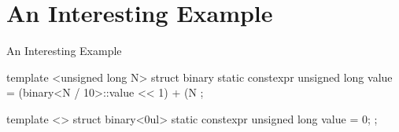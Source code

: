 \section{An Interesting Example}

\begin{frame}[fragile]{An Interesting Example}
    \begin{cpp}
template <unsigned long N>
struct binary {
  static constexpr unsigned long value
      = (binary<N / 10>::value << 1) + (N %
};

template <>
struct binary<0ul> {
  static constexpr unsigned long value = 0;
};
    \end{cpp}
\end{frame}